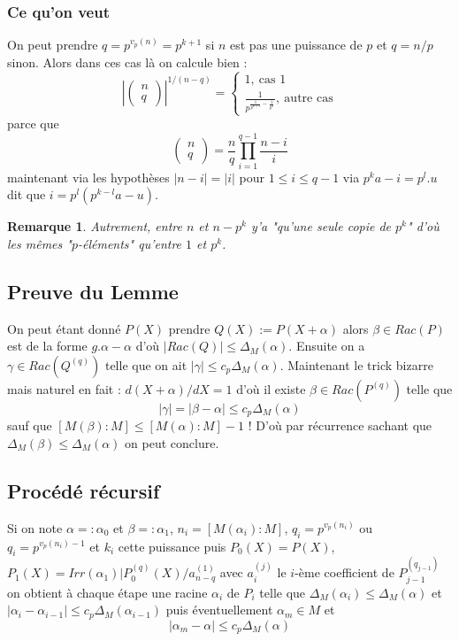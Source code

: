 \documentclass[a4paper,12pt]{article}
\theoremstyle{plain}
\newtheorem{rem}{Remarque}
\theoremstyle{definition}
\theoremstyle{remark}
\begin{document}
\subsubsection{Ce qu'on veut}
On peut prendre $q=p^{v_p(n)}=p^{k+1}$ si $n$ est pas une
puissance de $p$ et $q=n/p$ sinon. Alors dans ces cas
là on calcule bien :
\[|\begin{pmatrix} n\\ q\end{pmatrix}|^{1/(n-q)}=\begin{cases} 1,~\textrm{cas 1}\\\frac{1}{p^{\frac{1}{p^{k+1}}-\frac{1}{p^{k}}}},~\textrm{autre cas}\end{cases}\]
parce que 
\[\begin{pmatrix} n\\ q\end{pmatrix}=\frac{n}{q}\prod_{i=1}^{q-1}\frac{n-i}{i}\]
maintenant via les hypothèses $|n-i|=|i|$ pour
$1\leq i\leq q-1$ via $p^ka-i=p^l.u$ dit que
$i=p^l(p^{k-l}a-u)$.

\begin{rem}
  Autrement, entre $n$ et $n-p^k$ y'a "qu'une seule
  copie de $p^k$" d'où les mêmes "$p$-éléments" qu'entre
  $1$ et $p^k$.
\end{rem}

\subsection{Preuve du Lemme}
On peut étant donné $P(X)$ prendre $Q(X):=P(X+\alpha)$
alors $\beta\in Rac(P)$ est de la forme 
$g.\alpha-\alpha$ d'où $|Rac(Q)|\leq \Delta_M(\alpha)$.
Ensuite on a $\gamma\in Rac(Q^{(q)})$ telle que 
on ait $|\gamma|\leq c_p\Delta_M(\alpha)$. Maintenant
le trick bizarre mais naturel en fait : 
$d(X+\alpha)/dX=1$ d'où il existe 
$\beta\in Rac(P^{(q)})$ telle que 
\[|\gamma|=|\beta-\alpha|\leq c_p\Delta_M(\alpha)\]
sauf que $[M(\beta):M]\leq [M(\alpha):M]-1$ ! D'où
par récurrence sachant que 
$\Delta_M(\beta)\leq \Delta_M(\alpha)$ on peut conclure.

\subsection{Procédé récursif}
Si on note $\alpha=:\alpha_0$ et $\beta=:\alpha_1$, 
$n_i=[M(\alpha_i):M]$, $q_i=p^{v_p(n_i)}$ ou 
$q_i=p^{v_p(n_i)-1}$ et $k_i$ cette puissance puis
$P_0(X)=P(X)$, 
$P_1(X)=Irr(\alpha_1)|P_0^{(q)}(X)/a_{n-q}^{(1)}$
avec $a_i^{(j)}$ le $i$-ème coefficient de 
$P_{j-1}^{(q_{j-1})}$ on obtient à chaque étape 
une racine $\alpha_i$ de $P_i$ telle que 
$\Delta_M(\alpha_i)\leq \Delta_M(\alpha)$ et 
$|\alpha_i-\alpha_{i-1}|\leq c_p \Delta_M(\alpha_{i-1})$
puis éventuellement $\alpha_m\in M$ et 
\[|\alpha_m-\alpha|\leq c_p\Delta_M(\alpha)\]
\end{document}
